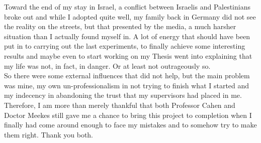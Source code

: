 \begin{personalintro}
Toward the end of my stay in Israel, a conflict between Israelis and Palestinians broke out and while I adopted quite well, my family back in Germany did not see the reality on the streets, but that presented by the media, a much harsher situation than I actually found myself in. A lot of energy that should have been put in to carrying out the last experiments, to finally achieve some interesting results and maybe even to start working on my Thesis went into explaining that my life was not, in fact, in danger. Or at least not outrageously so.\\
So there were some external influences that did not help, but the main problem was mine, my own un-professionalism in not trying to finish what I started and my indecency in abandoning the trust that my supervisors had placed in me.\\
Therefore, I am more than merely thankful that both Professor Cahen and Doctor Meekes still gave me a chance to bring this project to completion when I finally had come around enough to face my mistakes and to somehow try to make them right. Thank you both.\\
\end{personalintro}